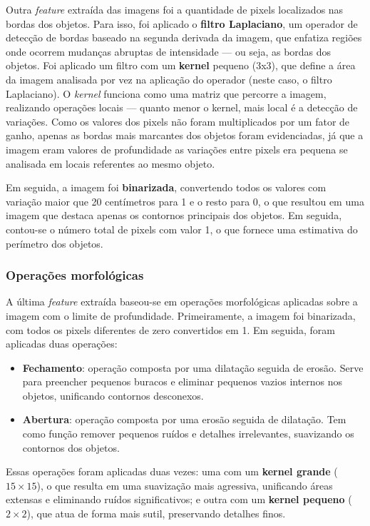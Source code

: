 Outra \textit{feature} extraída das imagens foi a quantidade de pixels localizados nas bordas dos objetos. Para isso, foi aplicado o \textbf{filtro Laplaciano}, um operador de detecção de bordas baseado na segunda derivada da imagem, que enfatiza regiões onde ocorrem mudanças abruptas de intensidade — ou seja, as bordas dos objetos. Foi aplicado um filtro com um \textbf{kernel} pequeno (3x3), que define a área da imagem analisada por vez na aplicação do operador (neste caso, o filtro Laplaciano). O \textit{kernel} funciona como uma matriz que percorre a imagem, realizando operações locais — quanto menor o kernel, mais local é a detecção de variações. Como os valores dos pixels não foram multiplicados por um fator de ganho, apenas as bordas mais marcantes dos objetos foram evidenciadas, já que a imagem eram valores de profundidade as variações entre pixels era pequena se analisada em locais referentes ao mesmo objeto.

Em seguida, a imagem foi \textbf{binarizada}, convertendo todos os valores com variação maior que 20 centímetros para 1 e o resto para 0, o que resultou em uma imagem que destaca apenas os contornos principais dos objetos. Em seguida, contou-se o número total de pixels com valor 1, o que fornece uma estimativa do perímetro dos objetos.

\subsubsection{Operações morfológicas}

A última \textit{feature} extraída baseou-se em operações morfológicas aplicadas sobre a imagem com o limite de profundidade. Primeiramente, a imagem foi binarizada, com todos os pixels diferentes de zero convertidos em 1. Em seguida, foram aplicadas duas operações:

\begin{itemize}
    \item \textbf{Fechamento}: operação composta por uma dilatação seguida de erosão. Serve para preencher pequenos buracos e eliminar pequenos vazios internos nos objetos, unificando contornos desconexos.
    \item \textbf{Abertura}: operação composta por uma erosão seguida de dilatação. Tem como função remover pequenos ruídos e detalhes irrelevantes, suavizando os contornos dos objetos.
\end{itemize}

Essas operações foram aplicadas duas vezes: uma com um \textbf{kernel grande} ($15 \times 15$), o que resulta em uma suavização mais agressiva, unificando áreas extensas e eliminando ruídos significativos; e outra com um \textbf{kernel pequeno} ($2 \times 2$), que atua de forma mais sutil, preservando detalhes finos.

